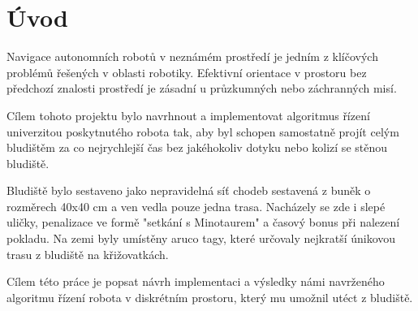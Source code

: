 \section{Úvod}





Navigace autonomních robotů v neznámém prostředí je jedním z klíčových problémů řešených v oblasti robotiky. Efektivní orientace v prostoru bez předchozí znalosti prostředí je zásadní u průzkumných nebo záchranných misí.

Cílem tohoto projektu bylo navrhnout a implementovat algoritmus řízení univerzitou poskytnutého robota tak, aby byl schopen samostatně projít celým bludištěm za co nejrychlejší čas bez jakéhokoliv dotyku nebo kolizí se stěnou bludiště.

Bludiště bylo sestaveno jako nepravidelná síť chodeb sestavená z buněk o rozměrech 40x40 cm a ven vedla pouze jedna trasa. Nacházely se zde i slepé uličky, penalizace ve formě "setkání s Minotaurem" a časový bonus při nalezení pokladu. Na zemi byly umístěny aruco tagy, které určovaly nejkratší únikovou trasu z bludiště na křižovatkách.

Cílem této práce je popsat návrh implementaci a výsledky námi navrženého algoritmu řízení robota v diskrétním prostoru, který mu umožnil utéct z bludiště.
